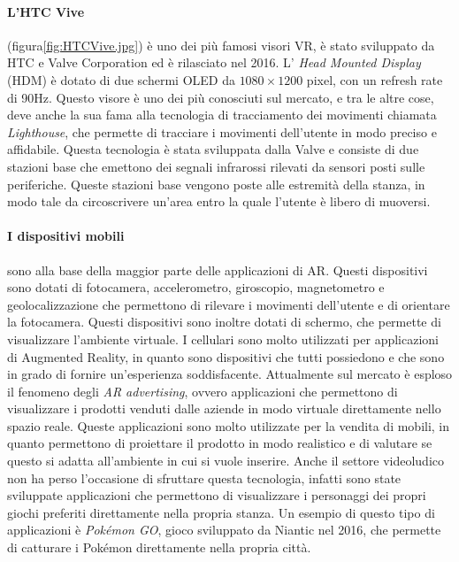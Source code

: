         \paragraph{L'HTC Vive} (figura\ref{fig:HTCVive.jpg}) è uno dei più famosi visori VR, è stato sviluppato da HTC e Valve Corporation ed è
            rilasciato nel 2016. L' \textit{Head Mounted Display} (HDM) è dotato di due schermi OLED da $1080\times1200$ pixel, 
            con un refresh rate di 90Hz\cite{Vive}. Questo visore è uno dei più conosciuti sul mercato, 
            e tra le altre cose, deve anche la sua fama alla tecnologia di tracciamento dei movimenti chiamata \textit{Lighthouse}, che permette di tracciare
            i movimenti dell'utente in modo preciso e affidabile. Questa tecnologia è stata sviluppata dalla Valve
            e consiste di due stazioni base che emettono dei segnali infrarossi rilevati da sensori posti 
            sulle periferiche. Queste stazioni base vengono poste alle estremità della stanza, in modo tale da circoscrivere
            un'area entro la quale l'utente è libero di muoversi.

        \paragraph{I dispositivi mobili} sono alla base della maggior parte delle applicazioni di AR. Questi dispositivi
            sono dotati di fotocamera, accelerometro, giroscopio, magnetometro e geolocalizzazione che permettono di rilevare i movimenti
            dell'utente e di orientare la fotocamera. Questi dispositivi sono inoltre dotati di schermo, che permette di
            visualizzare l'ambiente virtuale. I cellulari sono molto utilizzati per applicazioni di Augmented Reality, in quanto
            sono dispositivi che tutti possiedono e che sono in grado di fornire un'esperienza soddisfacente.
            Attualmente sul mercato è esploso il fenomeno degli \textit{AR advertising}, ovvero applicazioni che permettono
            di visualizzare i prodotti venduti dalle aziende in modo virtuale direttamente nello spazio reale. Queste applicazioni
            sono molto utilizzate per la vendita di mobili, in quanto permettono di proiettare il prodotto in modo realistico
            e di valutare se questo si adatta all'ambiente in cui si vuole inserire. Anche il settore videoludico non ha 
            perso l'occasione di sfruttare questa tecnologia, infatti sono state sviluppate applicazioni che permettono di
            visualizzare i personaggi dei propri giochi preferiti direttamente nella propria stanza. Un esempio di questo
            tipo di applicazioni è \textit{Pokémon GO}, gioco sviluppato da Niantic nel 2016, che permette di catturare i
            Pokémon direttamente nella propria città.
            
